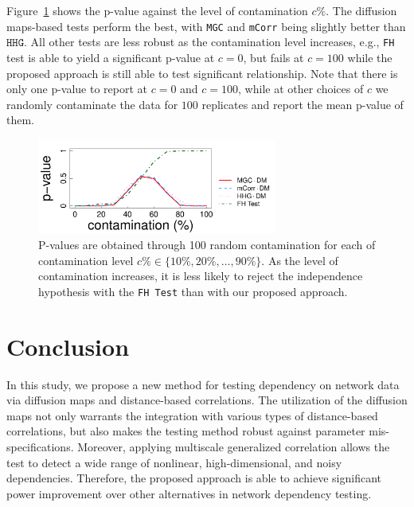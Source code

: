 \documentclass[12pt]{article}
\theoremstyle{definition}
\begin{document}
	Figure~\ref{fig:realexample} shows the p-value against the level of contamination $c \%$. The diffusion maps-based tests perform the best, with \texttt{MGC} and \texttt{mCorr} being slightly better than $\texttt{HHG}$. All other tests are less robust as the contamination level increases, e.g., \texttt{FH} test is able to yield a significant p-value at $c=0$, but fails at $c=100$ while the proposed approach is still able to test significant relationship. Note that there is only one p-value to report at $c=0$ and $c=100$, while at other choices of $c$ we randomly contaminate the data for $100$ replicates and report the mean p-value of them.
	
	\begin{figure}[ht]
		\centering
		\includegraphics[width=0.7\textwidth]{../Figure/Elbow3_t3.pdf}
		\caption{P-values are obtained through 100 random contamination for each of contamination level $c\% \in \{ 10\%, 20\%, \ldots, 90\% \}$. As the level of contamination increases, it is less likely to reject the independence hypothesis with the \texttt{FH Test} than with our proposed approach.}
		\label{fig:realexample}
	\end{figure}
	
	\section{Conclusion}
	\label{sec:conc}
	
	In this study, we propose a new method for testing dependency on network data via diffusion maps and distance-based correlations. The utilization of the diffusion maps not only warrants the integration with various types of distance-based correlations, but also makes the testing method robust against parameter mis-specifications. Moreover, applying multiscale generalized correlation allows the test to detect a wide range of nonlinear, high-dimensional, and noisy dependencies. Therefore, the proposed approach is able to achieve significant power improvement over other alternatives in network dependency testing. 
	
\end{document}
